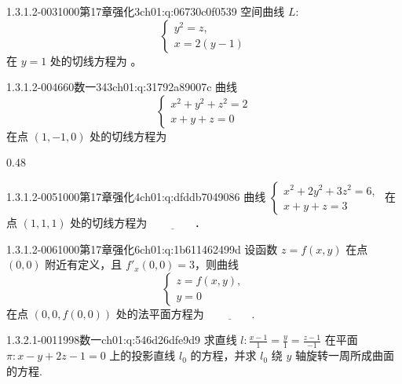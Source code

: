 \begin{q}{1.3.1.2-003}{1000第17章强化3}{ch01:q:06730c0f0539}
空间曲线 $L$: \[ \begin{cases} y^2=z, \\ x=2(y-1) \end{cases} \] 在 $y=1$ 处的切线方程为 \underline{\hspace{4em}}。
\end{q}

\begin{q}{1.3.1.2-004}{660数一343}{ch01:q:31792a89007c}
曲线 \[\begin{cases} x^2+y^2+z^2=2 \\ x+y+z=0 \end{cases}\] 在点 $(1,-1,0)$ 处的切线方程为
\begin{opts}{0.48}
\hfill{}\\[0.3ex]
\hfill{}
\end{opts}
\end{q}

\begin{q}{1.3.1.2-005}{1000第17章强化4}{ch01:q:dfddb7049086}
曲线 $\begin{cases} x^2+2y^2+3z^2=6, \\ x+y+z=3 \end{cases}$ 在点 $(1,1,1)$ 处的切线方程为 $\underline{\hspace{4em}}$．
\end{q}

\begin{q}{1.3.1.2-006}{1000第17章强化6}{ch01:q:1b611462499d}
设函数 $z=f(x,y)$ 在点 $(0,0)$ 附近有定义，且 $f'_x(0,0)=3$，则曲线
\[\begin{cases}
z=f(x,y),\\
y=0
\end{cases}\]
在点 $(0,0,f(0,0))$ 处的法平面方程为 $\underline{\hspace{4em}}$.
\end{q}

\par\addvspace{2.4ex}\noindent
\begin{minipage}{\linewidth}


\begin{q}{1.3.2.1-001}{1998数一}{ch01:q:546d26dfe9d9}
求直线 $l:\frac{x-1}{1}=\frac{y}{1}=\frac{z-1}{-1}$ 在平面 $\pi:x-y+2z-1=0$ 上的投影直线 $l_0$ 的方程，并求 $l_0$ 绕 $y$ 轴旋转一周所成曲面的方程.
\end{q}
\end{minipage}


